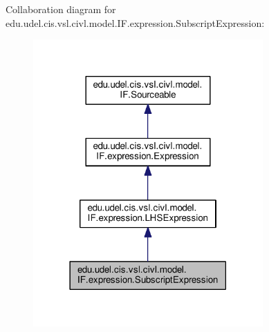 Collaboration diagram for edu.\+udel.\+cis.\+vsl.\+civl.\+model.\+I\+F.\+expression.\+Subscript\+Expression\+:
\nopagebreak
\begin{figure}[H]
\begin{center}
\leavevmode
\includegraphics[width=249pt]{interfaceedu_1_1udel_1_1cis_1_1vsl_1_1civl_1_1model_1_1IF_1_1expression_1_1SubscriptExpression__coll__graph}
\end{center}
\end{figure}
